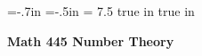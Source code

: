 \def\cmb{\MidnightBlue}	  %
\def\cnb{\NavyBlue}	  %
\def\crb{\RoyalBlue}	  %
\def\cce{\Cerulean}	  %
\def\ccy{\Cyan}		  %
\def\cpb{\ProcessBlue}	  %
\def\csb{\SkyBlue}	  %
\def\ctu{\Turquoise}	  %
\def\ctb{\TealBlue}	  %
\def\caq{\Aquamarine}	  %
\def\cbg{\BlueGreen}	  %
\def\cem{\Emerald}	  %
\def\cjg{\JungleGreen}	  %
\def\csg{\SeaGreen}	  %
\def\cgg{\Green}	  %
\def\cfg{\ForestGreen}	  %
\def\cpg{\PineGreen}	  %
\def\clg{\LimeGreen}	  %
\def\cyg{\YellowGreen}	  %
\def\cspg{\SpringGreen}	  %
\def\cog{\OliveGreen}	  %
\def\pars{\RawSienna}	  %
\def\cse{\Sepia}		  %
\def\cbr{\Brown}		  %
\def\cta{\Tan}		  %
\def\cgr{\Gray}		  %
\def\cbl{\Black}		  %
\def\cwh{\White}		  %


\voffset=-.7in
\hoffset=-.5in
\hsize = 7.5 true in
 true in


\overfullrule=0pt


\def\ctln{\centerline}
\def\u{\underbar}
\def\ssk{\smallskip}
\def\msk{\medskip}
\def\bsk{\bigskip}
\def\hsk{\hskip.1in}
\def\hhsk{\hskip.2in}
\def\dsl{\displaystyle}
\def\hskp{\hskip1.5in}

\def\moda{\medspace {\underset a\to \equiv} \medspace}
\def\modb{\medspace {\underset b\to \equiv} \medspace}
\def\modc{\medspace {\underset c\to \equiv} \medspace}

\def\lra{$\Leftrightarrow$ }


\ctln{\bf Math 445 Number Theory}

